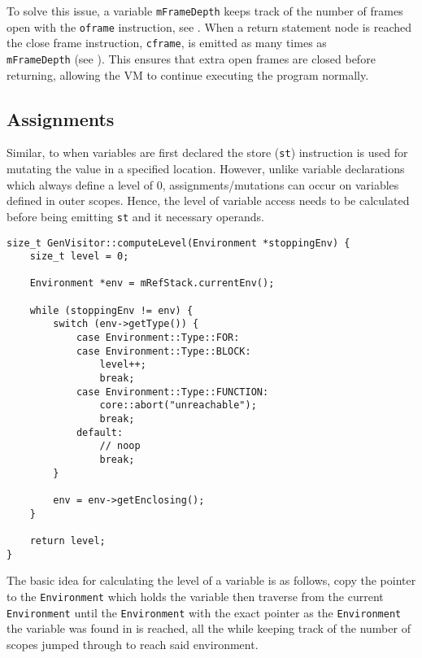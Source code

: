 To solve this issue, a variable \texttt{mFrameDepth} keeps track
of the number of frames open with the \texttt{oframe}
instruction, see . When a return statement
node is reached the close frame instruction, \texttt{cframe}, is
emitted as many times as \\ \texttt{mFrameDepth} (see
). This ensures that extra open frames are
closed before returning, allowing the VM to continue executing
the program normally.

\subsection{Assignments}

Similar, to when variables are first declared the store
(\texttt{st}) instruction is used for mutating the value in a
specified location. However, unlike variable declarations which
always define a level of $0$, assignments/mutations can occur on
variables defined in outer scopes. Hence, the level of variable
access needs to be calculated before being emitting \texttt{st}
and it necessary operands.

\begin{lstlisting}[caption={The \texttt{computeLevel()} method
in the \texttt{GenVisitor} class (ir\_gen/GenVisitor.cpp).},
label=lst:computelevel]
size_t GenVisitor::computeLevel(Environment *stoppingEnv) {
    size_t level = 0;

    Environment *env = mRefStack.currentEnv();

    while (stoppingEnv != env) {
        switch (env->getType()) {
            case Environment::Type::FOR:
            case Environment::Type::BLOCK:
                level++;
                break;
            case Environment::Type::FUNCTION:
                core::abort("unreachable");
                break;
            default:
                // noop
                break;
        }

        env = env->getEnclosing();
    }

    return level;
}
\end{lstlisting}

The basic idea for calculating the level of a variable is as
follows, copy the pointer to the \texttt{Environment} which
holds the variable then traverse from the current
\texttt{Environment} until the \texttt{Environment} with the
exact pointer as the \texttt{Environment} the variable was found
in is reached, all the while keeping track of the number of
scopes jumped through to reach said environment.

